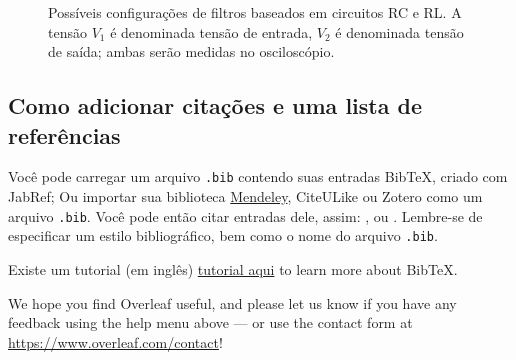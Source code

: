 \documentclass[a4paper]{article}
\begin{document}
\begin{figure}
\centering
\caption{Possíveis configurações de filtros baseados em circuitos RC e RL. A tensão $V_1$ é denominada tensão de entrada, $V_2$ é denominada tensão de saída; ambas serão medidas no osciloscópio.}
\label{fig:circuitos}
\end{figure}

\subsection{Como adicionar citações e uma lista de referências}

Você pode carregar um arquivo \verb|.bib| contendo suas entradas BibTeX, criado com JabRef; Ou importar sua biblioteca \href{https://www.overleaf.com/blog/184}{Mendeley}, CiteULike ou Zotero como um arquivo \verb|.bib|. Você pode então citar entradas dele, assim: \cite{Born:1969aa}, ou \cite{WalHalRes08}. Lembre-se de especificar um estilo bibliográfico, bem como o nome do arquivo \verb|.bib|. 

Existe um tutorial (em inglês) \href{https://www.overleaf.com/help/97-how-to-include-a-bibliography-using-bibtex}{tutorial aqui} to learn more about BibTeX.

We hope you find Overleaf useful, and please let us know if you have any feedback using the help menu above --- or use the contact form at \url{https://www.overleaf.com/contact}!


\end{document}
